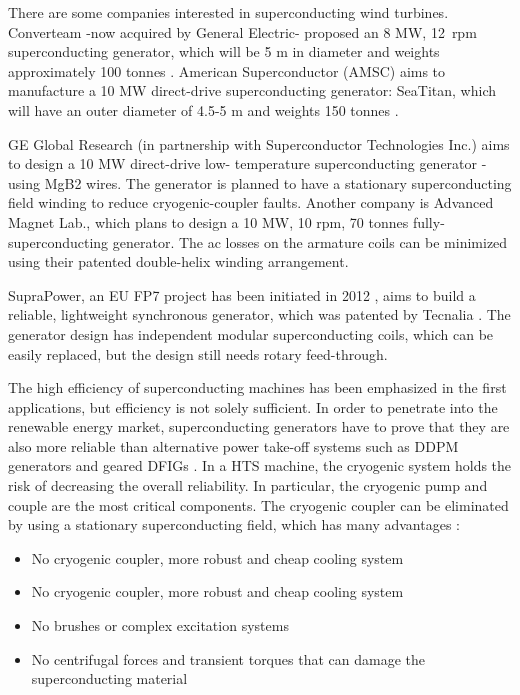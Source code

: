 \documentclass[a4paper, 11pt]{article} %
\begin{document}
There are some companies interested in superconducting wind turbines. Converteam -now acquired by General Electric- proposed an 8 MW, 12~rpm superconducting generator, which will be 5 m in diameter and weights approximately 100 tonnes \cite{Lewis2007}. American Superconductor (AMSC) aims to manufacture a 10 MW direct-drive superconducting generator: SeaTitan, which will have an outer diameter of 4.5-5 m and weights 150 tonnes \cite{Snitchler2011}.

GE Global Research (in partnership with Superconductor Technologies Inc.) aims to design a 10 MW direct-drive low- temperature superconducting generator -using MgB2 wires. The generator is planned to have a stationary superconducting field winding to reduce cryogenic-coupler faults. Another company is Advanced Magnet Lab., which plans to design a 10 MW, 10 rpm, 70 tonnes fully-superconducting generator. The ac losses on the armature coils can be minimized using their patented double-helix winding arrangement.

SupraPower, an EU FP7 project has been initiated in 2012 \cite{suprapower}, aims to build a reliable, lightweight synchronous generator, which was patented by Tecnalia \cite{SarmientoMunoz2011}. The generator design has independent modular superconducting coils, which can be easily replaced, but the design still needs rotary feed-through.

The high efficiency of superconducting machines has been emphasized in the first applications, but efficiency is not solely sufficient. In order to penetrate into the renewable energy market,  superconducting generators have to prove that they are also more reliable than alternative power take-off systems such as DDPM generators and geared DFIGs \cite{Abrahamsen2010}. In a HTS machine, the cryogenic system holds the risk of decreasing the overall reliability. In particular, the cryogenic pump and couple are the most critical components. The cryogenic coupler can be eliminated by using a stationary superconducting field, which has many advantages \cite{Gieras2008a,Keysan2011e}:

\begin{itemize}
	\item No cryogenic coupler, more robust and cheap cooling system
	\item No cryogenic coupler, more robust and cheap cooling system
	\item No brushes or complex excitation systems
	\item No centrifugal forces and transient torques that can damage the superconducting material
\end{itemize}







\end{document}
